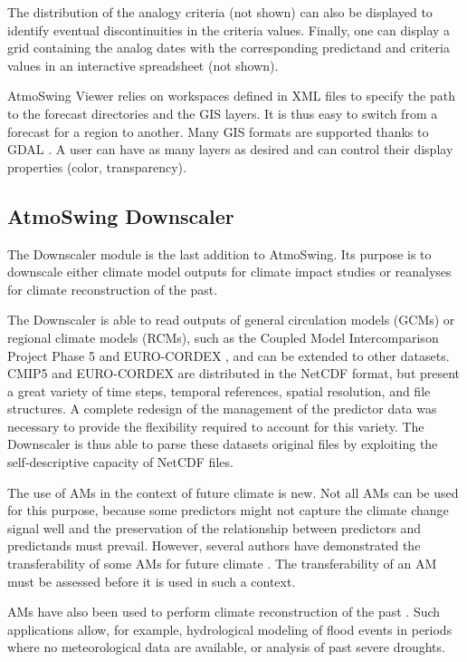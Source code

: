 \documentclass[review]{elsarticle}
\begin{document}
The distribution of the analogy criteria (not shown) can also be displayed to identify eventual discontinuities in the criteria values. Finally, one can display a grid containing the analog dates with the corresponding predictand and criteria values in an interactive spreadsheet (not shown). 

AtmoSwing Viewer relies on workspaces defined in XML files to specify the path to the forecast directories and the GIS layers. It is thus easy to switch from a forecast for a region to another. Many GIS formats are supported thanks to GDAL \cite[Geospatial Data Abstraction Library,][]{GDAL2014}. A user can have as many layers as desired and can control their display properties (color, transparency).


\subsection{AtmoSwing Downscaler}
\label{sec:downscaler}

The Downscaler module is the last addition to AtmoSwing. Its purpose is to downscale either climate model outputs for climate impact studies or reanalyses for climate reconstruction of the past. 

The Downscaler is able to read outputs of general circulation models (GCMs) or regional climate models (RCMs), such as the Coupled Model Intercomparison Project Phase 5 \citep[CMIP5,][]{Taylor2012} and EURO-CORDEX \citep{Jacob2014}, and can be extended to other datasets. CMIP5 and EURO-CORDEX are distributed in the NetCDF format, but present a great variety of time steps, temporal references, spatial resolution, and file structures. A complete redesign of the management of the predictor data was necessary to provide the flexibility required to account for this variety. The Downscaler is thus able to parse these datasets original files by exploiting the self-descriptive capacity of NetCDF files. 

The use of AMs in the context of future climate is new. Not all AMs can be used for this purpose, because some predictors might not capture the climate change signal well and the preservation of the relationship between predictors and predictands must prevail. However, several authors have demonstrated the transferability of some AMs for future climate \citep{Dayon2015, Dayon2018, Raynaud2016, Turco2017}. The transferability of an AM must be assessed before it is used in such a context. 

AMs have also been used to perform climate reconstruction of the past \citep{Caillouet2016, Caillouet2017, Bonnet2017}. Such applications allow, for example, hydrological modeling of flood events in periods where no meteorological data are available, or analysis of past severe droughts. 
\end{document}
